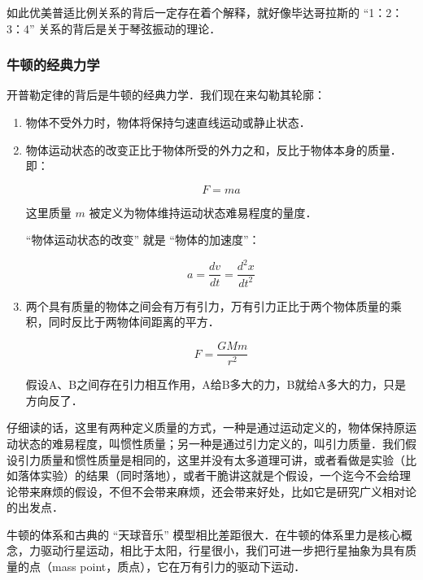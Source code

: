 如此优美普适比例关系的背后一定存在着个解释，就好像毕达哥拉斯的 “1：2：3：4” 关系的背后是关于琴弦振动的理论．

\subsubsection{牛顿的经典力学}

开普勒定律的背后是牛顿的经典力学．我们现在来勾勒其轮廓：

\begin{enumerate}
\item 

物体不受外力时，物体将保持匀速直线运动或静止状态．

\item

物体运动状态的改变正比于物体所受的外力之和，反比于物体本身的质量．即：

\begin{equation}
F = ma
\end{equation}

这里质量 $m$ 被定义为物体维持运动状态难易程度的量度．

“物体运动状态的改变” 就是 “物体的加速度”：

\begin{equation}
a = \frac{d v}{d t} = \frac{d^2 x}{d t^2}
\end{equation}

\item

两个具有质量的物体之间会有万有引力，万有引力正比于两个物体质量的乘积，同时反比于两物体间距离的平方．

\begin{equation}
F = \frac{G M m}{r^2}
\end{equation}

假设A、B之间存在引力相互作用，A给B多大的力，B就给A多大的力，只是方向反了．

\end{enumerate}

仔细读的话，这里有两种定义质量的方式，一种是通过运动定义的，物体保持原运动状态的难易程度，叫惯性质量；另一种是通过引力定义的，叫引力质量．我们假设引力质量和惯性质量是相同的，这里并没有太多道理可讲，或者看做是实验（比如落体实验）的结果（同时落地），或者干脆讲这就是个假设，一个迄今不会给理论带来麻烦的假设，不但不会带来麻烦，还会带来好处，比如它是研究广义相对论的出发点．

牛顿的体系和古典的 “天球音乐” 模型相比差距很大．在牛顿的体系里力是核心概念，力驱动行星运动，相比于太阳，行星很小，我们可进一步把行星抽象为具有质量的点（mass point，质点），它在万有引力的驱动下运动．

